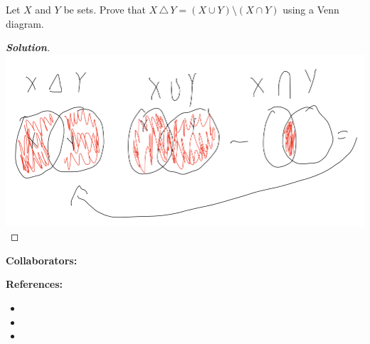 \documentclass[11pt]{article}
\newenvironment{problem}[2][Problem\!]{\begin{trivlist}
\item[\hskip \labelsep {\bfseries #1}\hskip \labelsep {\bfseries #2.}]}{\end{trivlist}}
\newenvironment{solution}{\begin{proof}[\textbf{\textit{Solution}}]}{\end{proof}}
\begin{document}
\newpage  %

\begin{problem}{1.3}
Let $X$ and $Y$ be sets. Prove that $X\, \triangle\, Y = (X \cup Y) \setminus (X \cap Y)$ using a Venn diagram. 
\end{problem}
\begin{solution}\hfill %
\includegraphics[scale=0.5]{Screenshot_14.png}
\end{solution}

\newpage  %

\begin{center}
\textbf{Collaborators:}
\end{center}
\vfill 

\begin{center}
\textbf{References:}
\end{center}
\begin{itemize}
\item[$\bullet$] [Book(s): Title, Author]
\item[$\bullet$] [Online: \href{http://example.com/}{Link}]
\item[$\bullet$] [Notes: \href{http://example.com/}{Link}]
\end{itemize}

\vfill
\end{document}
